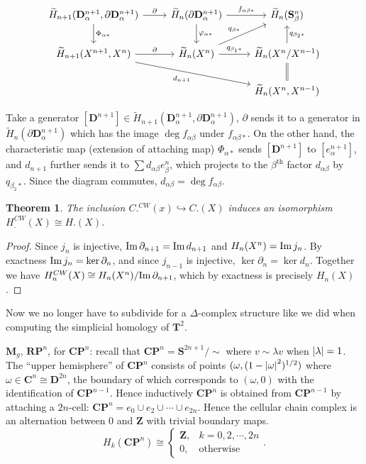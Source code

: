 \documentclass[11pt]{article}
\theoremstyle{definition}
\theoremstyle{plain}
\newtheorem{theorem}{Theorem}[section]
\newcommand{\im}{\textup{Im}\,}
\newcommand{\Z}{\mathbf{Z}}
\begin{document}
\[\begin{tikzcd}
\widetilde{H}_{n+1}(\mathbf{D}_\alpha^{n+1},\partial\mathbf{D}^{n+1}_\alpha)\arrow{d}{\Phi_{\alpha\ast}}\arrow{r}{\partial}&\widetilde{H}_n(\partial\mathbf{D}_\alpha^{n+1})\arrow{d}{\varphi_{\alpha\ast}}\arrow{r}{f_{\alpha\beta\ast}}&\widetilde{H}_n(\mathbf{S}_\beta^n)\\
\widetilde{H}_{n+1}(X^{n+1},X^n)\arrow[swap]{drr}{d_{n+1}}\arrow{r}{\partial}&\widetilde{H}_n(X^n)\arrow{ur}{q_{\beta\ast}}\arrow{r}{q_{\beta_1\ast}}&\widetilde{H}_n(X^n/X^{n-1})\arrow[swap]{u}{q_{\beta_2\ast}}\\
&&\widetilde{H}_n(X^n,X^{n-1})\arrow[equal]{u}
\end{tikzcd}\]

Take a generator $[\mathbf{D}^{n+1}]\in\widetilde{H}_{n+1}(\mathbf{D}_\alpha^{n+1},\partial\mathbf{D}^{n+1}_\alpha)$, $\partial$ sends it to a generator in $\widetilde{H}_n(\partial\mathbf{D}_\alpha^{n+1})$ which has the image $\deg f_{\alpha\beta}$ under $f_{\alpha\beta\ast}$. On the other hand, the characteristic map (extension of attaching map) $\Phi_{\alpha\ast}$ sends $[\mathbf{D}^{n+1}]$ to $[e_\alpha^{n+1}]$, and $d_{n+1}$ further sends it to $\sum d_{\alpha\beta}e_\beta^n$, which projects to the $\beta^{\mathrm{th}}$ factor $d_{\alpha\beta}$ by $q_{\beta_2\ast}$. Since the diagram commutes, $d_{\alpha\beta}=\deg f_{\alpha\beta}$.

\begin{theorem}
The inclusion $C.^{CW}(x)\hookrightarrow C.(X)$ induces an isomorphism
$H_.^{CW}(X)\cong H.(X)$.
\end{theorem}
\begin{proof}
Since $j_n$ is injective, $\im\partial_{n+1}=\im d_{n+1}$ and $H_n(X^n)=\im j_n$. By exactness $\im j_n=\ker\partial_n$, and since $j_{n-1}$ is injective, $\ker\partial_n=\ker d_n$. Together we have $H_n^{CW}(X)\cong H_n(X^n)/\im\partial_{n+1}$, which by exactness is precisely $H_n(X)$.
\end{proof}

Now we no longer have to subdivide for a $\Delta$-complex structure like we did when computing the simplicial homology of $\mathbf{T}^2$.\medbreak

$\mathbf{M}_g$, $\mathbf{RP}^n$, for $\mathbf{CP}^n$: recall that $\mathbf{CP}^n=\mathbf{S}^{2n+1}/\sim$ where $v\sim\lambda v$ when $\abs{\lambda}=1$. The ``upper hemisphere'' of $\mathbf{CP}^n$ consists of points $(\omega,(1-\abs{\omega}^2)^{1/2})$ where $\omega\in\mathbf{C}^n\cong\mathbf{D}^{2n}$, the boundary of which corresponds to $(\omega,0)$ with the identification of $\mathbf{CP}^{n-1}$. Hence inductively $\mathbf{CP}^n$ is obtained from $\mathbf{CP}^{n-1}$ by attaching a $2n$-cell: $\mathbf{CP}^n=e_0\cup e_2\cup\cdots\cup e_{2n}$. Hence the cellular chain complex is an alternation between $0$ and $\Z$ with trivial boundary maps.
\[H_k(\mathbf{CP}^n)\cong\begin{cases}
\Z,&k=0,2,\cdots,2n\\0,&\textrm{otherwise}
\end{cases}.\]
\end{document}
